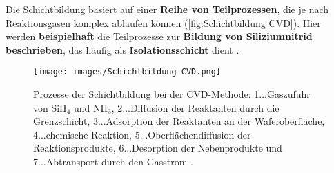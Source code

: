 \documentclass{article} %
\begin{document}
Die Schichtbildung basiert auf einer \textbf{Reihe von Teilprozessen}, die je nach Reaktionsgasen komplex ablaufen können (\autoref{fig:Schichtbildung CVD}). Hier werden \textbf{beispielhaft} die Teilprozesse zur \textbf{Bildung von Siliziumnitrid beschrieben}, das häufig als \textbf{Isolationsschicht} dient \cite{keplinger2024CVD}.

\begin{figure}[htb!]
    \centering
    \texttt{[image: images/Schichtbildung CVD.png]} %
    \captionsetup{labelfont=bf, width=.7\textwidth} %
    \caption{Prozesse der Schichtbildung bei der CVD-Methode: 1...Gaszufuhr von SiH$_4$ und NH$_3$, 2...Diffusion der Reaktanten durch die Grenzschicht, 3...Adsorption der Reaktanten an der Waferoberfläche, 4...chemische Reaktion, 5...Oberflächendiffusion der Reaktionsprodukte, 6...Desorption der Nebenprodukte und 7...Abtransport durch den Gasstrom \cite{keplinger2024CVD}.}
    \label{fig:Schichtbildung CVD}
\end{figure}
\end{document}
